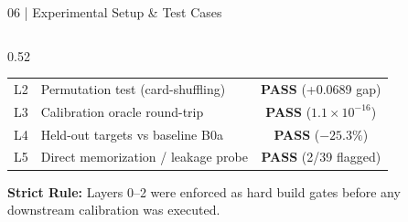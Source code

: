 \documentclass[10pt,aspectratio=169]{beamer}
\begin{document}
\begin{frame}{06 | Experimental Setup \& Test Cases}
\begin{columns}[T]
\begin{column}{0.52\textwidth}
\begin{table}
\begin{tabularx}{\textwidth}{@{} c >{\raggedright\arraybackslash}X c @{}}
                \rowcolor{RowAlt} L2 & Permutation test (card-shuffling) & {\color{TLGreen}\textbf{PASS}} (+0.0689 gap) \\
                L3 & Calibration oracle round-trip & {\color{TLGreen}\textbf{PASS}} ($1.1\times 10^{-16}$) \\
                \rowcolor{RowAlt} L4 & Held-out targets vs baseline B0a & {\color{TLGreen}\textbf{PASS}} ($-25.3\%$) \\
                L5 & Direct memorization / leakage probe & {\color{TLGreen}\textbf{PASS}} (2/39 flagged) \\
                \bottomrule
            \end{tabularx}
            \end{table}
            \tiny \textbf{Strict Rule:} Layers 0--2 were enforced as hard build gates before any downstream calibration was executed.
        \end{column}
    \end{columns}
\end{frame}
\end{document}
